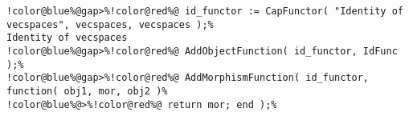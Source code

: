 \begin{Verbatim}[commandchars=!@\%,frame=single]
!color@blue%@gap>%!color@red%@ id_functor := CapFunctor( "Identity of vecspaces", vecspaces, vecspaces );%
Identity of vecspaces
!color@blue%@gap>%!color@red%@ AddObjectFunction( id_functor, IdFunc );%
!color@blue%@gap>%!color@red%@ AddMorphismFunction( id_functor, function( obj1, mor, obj2 )%
!color@blue%@>%!color@red%@ return mor; end );%
\end{Verbatim}
